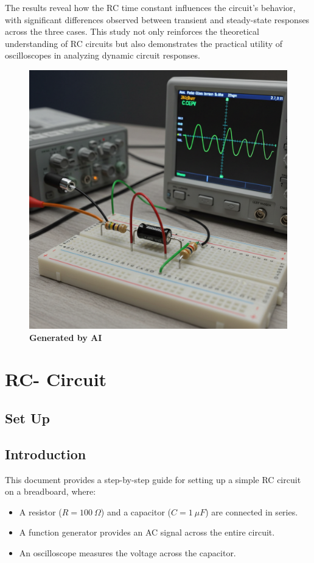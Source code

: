 \documentclass[12pt,a4paper]{report}
\begin{document}
The results reveal how the RC time constant influences the circuit's behavior, with significant differences observed between transient and steady-state responses across the three cases. This study not only reinforces the theoretical understanding of RC circuits but also demonstrates the practical utility of oscilloscopes in analyzing dynamic circuit responses.
\begin{figure}
    \centering
    \includegraphics[width=\textwidth]{figs/ref.png}
    \label{fig:enter-label}
    \textbf{Generated by AI}
\end{figure}


\tableofcontents



\listoffigures


\chapter{RC- Circuit}
\section{Set Up}
\section*{Introduction}
This document provides a step-by-step guide for setting up a simple RC circuit on a breadboard, where:
\begin{itemize}
    \item A resistor (\( R = 100\ \Omega \)) and a capacitor (\( C = 1\ \mu F \)) are connected in series.
    \item A function generator provides an AC signal across the entire circuit.
    \item An oscilloscope measures the voltage across the capacitor.
\end{itemize}
\end{document}
